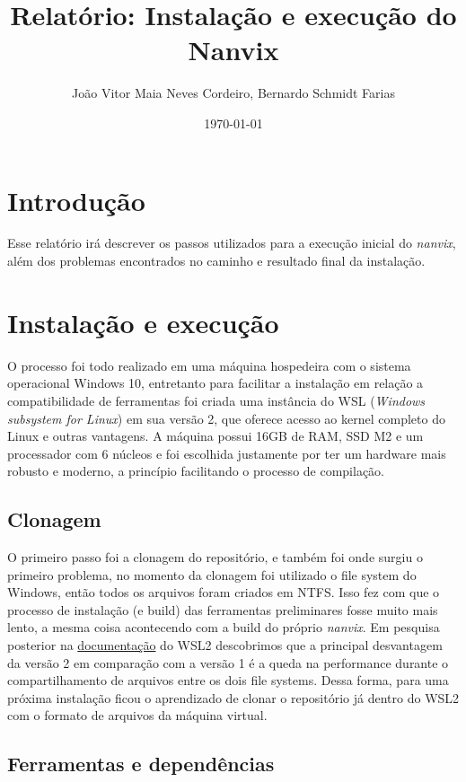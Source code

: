 \documentclass[12pt]{article}
\author{João Vitor Maia Neves Cordeiro, Bernardo Schmidt Farias}
\title{Relatório: Instalação e execução do Nanvix}
\date{\today}
\begin{document}
\maketitle

\section{Introdução}

Esse relatório irá descrever os passos utilizados para a execução inicial do \emph{nanvix}, além dos problemas encontrados no caminho e resultado final da instalação.

\section{Instalação e execução}

O processo foi todo realizado em uma máquina hospedeira com o sistema operacional Windows 10, entretanto para facilitar a instalação em relação a compatibilidade de ferramentas foi criada uma instância do WSL (\emph{Windows subsystem for Linux}) em sua versão 2, que oferece acesso ao kernel completo do Linux e outras vantagens. A máquina possui 16GB de RAM, SSD M2 e um processador com 6 núcleos e foi escolhida justamente por ter um hardware mais robusto e moderno, a princípio facilitando o processo de compilação.

\subsection{Clonagem}

O primeiro passo foi a clonagem do repositório, e também foi onde surgiu o primeiro problema, no momento da clonagem foi utilizado o file system do Windows, então todos os arquivos foram criados em NTFS. Isso fez com que o processo de instalação (e build) das ferramentas preliminares fosse muito mais lento, a mesma coisa acontecendo com a build do próprio \emph{nanvix}. Em pesquisa posterior na \href{https://docs.microsoft.com/en-us/windows/wsl/compare-versions}{documentação} do WSL2 descobrimos que a principal desvantagem da versão 2 em comparação com a versão 1 é a queda na performance durante o compartilhamento de arquivos entre os dois file systems. Dessa forma, para uma próxima instalação ficou o aprendizado de clonar o repositório já dentro do WSL2 com o formato de arquivos da máquina virtual.

\subsection{Ferramentas e dependências}
\end{document}
